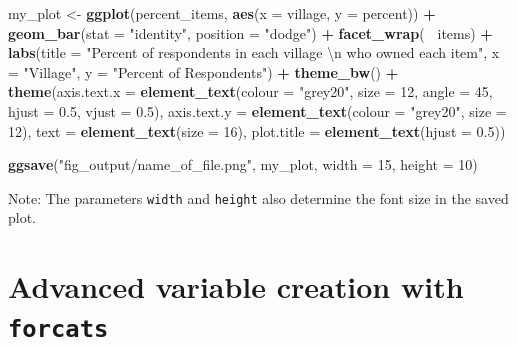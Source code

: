 \documentclass[]{book}
\newenvironment{Shaded}{\begin{snugshade}}{\end{snugshade}}
\newcommand{\KeywordTok}[1]{\textcolor[rgb]{0.13,0.29,0.53}{\textbf{#1}}}
\newcommand{\DataTypeTok}[1]{\textcolor[rgb]{0.13,0.29,0.53}{#1}}
\newcommand{\DecValTok}[1]{\textcolor[rgb]{0.00,0.00,0.81}{#1}}
\newcommand{\FloatTok}[1]{\textcolor[rgb]{0.00,0.00,0.81}{#1}}
\newcommand{\CharTok}[1]{\textcolor[rgb]{0.31,0.60,0.02}{#1}}
\newcommand{\StringTok}[1]{\textcolor[rgb]{0.31,0.60,0.02}{#1}}
\newcommand{\OperatorTok}[1]{\textcolor[rgb]{0.81,0.36,0.00}{\textbf{#1}}}
\newcommand{\NormalTok}[1]{#1}
\begin{document}
\begin{Shaded}
\begin{Highlighting}[]
\NormalTok{my_plot <-}\StringTok{ }\KeywordTok{ggplot}\NormalTok{(percent_items, }\KeywordTok{aes}\NormalTok{(}\DataTypeTok{x =}\NormalTok{ village, }\DataTypeTok{y =}\NormalTok{ percent)) }\OperatorTok{+}
\StringTok{    }\KeywordTok{geom_bar}\NormalTok{(}\DataTypeTok{stat =} \StringTok{"identity"}\NormalTok{, }\DataTypeTok{position =} \StringTok{"dodge"}\NormalTok{) }\OperatorTok{+}
\StringTok{    }\KeywordTok{facet_wrap}\NormalTok{(}\OperatorTok{~}\StringTok{ }\NormalTok{items) }\OperatorTok{+}
\StringTok{    }\KeywordTok{labs}\NormalTok{(}\DataTypeTok{title =} \StringTok{"Percent of respondents in each village }\CharTok{\textbackslash{}n}\StringTok{ who owned each item"}\NormalTok{,}
         \DataTypeTok{x =} \StringTok{"Village"}\NormalTok{,}
         \DataTypeTok{y =} \StringTok{"Percent of Respondents"}\NormalTok{) }\OperatorTok{+}
\StringTok{    }\KeywordTok{theme_bw}\NormalTok{() }\OperatorTok{+}
\StringTok{    }\KeywordTok{theme}\NormalTok{(}\DataTypeTok{axis.text.x =} \KeywordTok{element_text}\NormalTok{(}\DataTypeTok{colour =} \StringTok{"grey20"}\NormalTok{, }\DataTypeTok{size =} \DecValTok{12}\NormalTok{, }\DataTypeTok{angle =} \DecValTok{45}\NormalTok{, }\DataTypeTok{hjust =} \FloatTok{0.5}\NormalTok{, }\DataTypeTok{vjust =} \FloatTok{0.5}\NormalTok{),}
          \DataTypeTok{axis.text.y =} \KeywordTok{element_text}\NormalTok{(}\DataTypeTok{colour =} \StringTok{"grey20"}\NormalTok{, }\DataTypeTok{size =} \DecValTok{12}\NormalTok{),}
          \DataTypeTok{text =} \KeywordTok{element_text}\NormalTok{(}\DataTypeTok{size =} \DecValTok{16}\NormalTok{),}
          \DataTypeTok{plot.title =} \KeywordTok{element_text}\NormalTok{(}\DataTypeTok{hjust =} \FloatTok{0.5}\NormalTok{))}

\KeywordTok{ggsave}\NormalTok{(}\StringTok{"fig_output/name_of_file.png"}\NormalTok{, my_plot, }\DataTypeTok{width =} \DecValTok{15}\NormalTok{, }\DataTypeTok{height =} \DecValTok{10}\NormalTok{)}
\end{Highlighting}
\end{Shaded}

Note: The parameters \texttt{width} and \texttt{height} also determine
the font size in the saved plot.

\chapter{\texorpdfstring{Advanced variable creation with
\texttt{forcats}}{Advanced variable creation with forcats}}\label{forcats}
\end{document}
